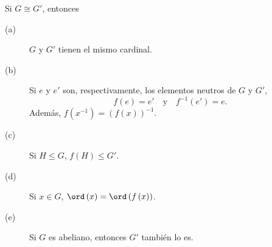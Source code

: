 \begin{fprop}[]
\normalfont Si $\displaystyle G \cong G' $, entonces
\begin{description}
\item[(a)] $\displaystyle G $ y $\displaystyle G' $ tienen el mismo cardinal.
\item[(b)] Si $\displaystyle e $ y $\displaystyle e' $ son, respectivamente, los elementos neutros de $\displaystyle G $ y $\displaystyle G' $,
	\[f\left(e\right) = e' \quad \text{y} \quad f^{-1}\left(e'\right) = e .\]
Además, $\displaystyle f\left(x^{-1}\right) = \left(f\left(x\right)\right)^{-1} $.
\item[(c)] Si $\displaystyle H \leq G $, $\displaystyle f\left(H\right) \leq G'$.
\item[(d)] Si $\displaystyle x \in G $, $\displaystyle \ord\left(x\right) = \ord\left(f\left(x\right)\right) $.
\item[(e)] Si $\displaystyle G $ es abeliano, entonces $\displaystyle G' $ también lo es.
\end{description}
\end{fprop}

